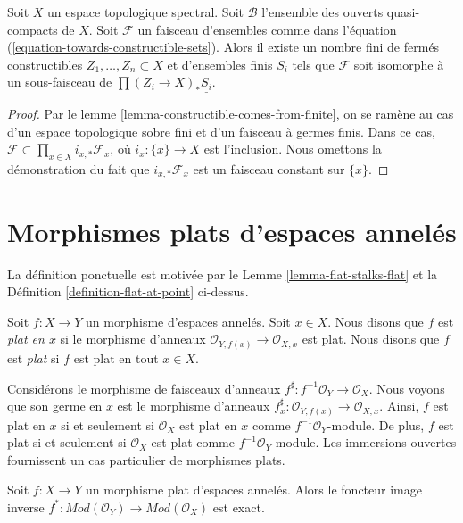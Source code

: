 \begin{lemma}
\label{lemma-constructible-in-constant}
Soit $X$ un espace topologique spectral. Soit $\mathcal{B}$
l'ensemble des ouverts quasi-compacts de $X$.
Soit $\mathcal{F}$ un faisceau d'ensembles comme dans
l'équation (\ref{equation-towards-constructible-sets}).
Alors il existe un nombre fini de fermés constructibles
$Z_1, \ldots, Z_n \subset X$ et d'ensembles finis $S_i$
tels que $\mathcal{F}$ soit isomorphe à un sous-faisceau de
$\prod (Z_i \to X)_*\underline{S_i}$.
\end{lemma}

\begin{proof}
Par le lemme \ref{lemma-constructible-comes-from-finite},
on se ramène au cas d'un espace topologique sobre fini
et d'un faisceau à germes finis.
Dans ce cas, $\mathcal{F} \subset \prod_{x \in X} i_{x, *}\mathcal{F}_x$,
où $i_x : \{x\} \to X$ est l'inclusion. Nous omettons la démonstration
du fait que $i_{x, *}\mathcal{F}_x$ est un faisceau constant sur $\overline{\{x\}}$.
\end{proof}
\section{Morphismes plats d'espaces annelés}
\label{section-flat-morphisms}

\noindent
La définition ponctuelle est motivée par le
Lemme \ref{lemma-flat-stalks-flat}
et la
Définition \ref{definition-flat-at-point}
ci-dessus.

\begin{definition}
\label{definition-flat-morphism}
Soit $f : X \to Y$ un morphisme d'espaces annelés.
Soit $x \in X$. Nous disons que $f$ est {\it plat en $x$}
si le morphisme d'anneaux $\mathcal{O}_{Y, f(x)} \to \mathcal{O}_{X, x}$ est plat.
Nous disons que $f$ est {\it plat} si $f$ est plat en tout $x \in X$.
\end{definition}

\noindent
Considérons le morphisme de faisceaux d'anneaux
$f^\sharp : f^{-1}\mathcal{O}_Y \to \mathcal{O}_X$.
Nous voyons que son germe en $x$ est le morphisme d'anneaux
$f^\sharp_x : \mathcal{O}_{Y, f(x)} \to \mathcal{O}_{X, x}$.
Ainsi, $f$ est plat en $x$ si et seulement si $\mathcal{O}_X$ est plat en $x$
comme $f^{-1}\mathcal{O}_Y$-module. De plus, $f$ est plat si et seulement si
$\mathcal{O}_X$ est plat comme $f^{-1}\mathcal{O}_Y$-module.
Les immersions ouvertes fournissent un cas particulier de morphismes plats.

\begin{lemma}
\label{lemma-pullback-flat}
Soit $f : X \to Y$ un morphisme plat d'espaces annelés.
Alors le foncteur image inverse
$f^* : \textit{Mod}(\mathcal{O}_Y) \to \textit{Mod}(\mathcal{O}_X)$
est exact.
\end{lemma}

